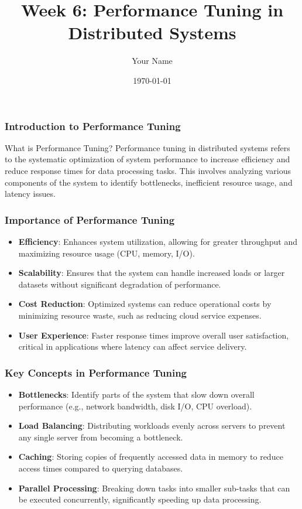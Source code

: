 \documentclass{beamer}
\title{Week 6: Performance Tuning in Distributed Systems}
\author{Your Name}
\institute{Your Institution}
\date{\today}
\begin{document}
\frame{\titlepage}

\begin{frame}[fragile]
    \frametitle{Introduction to Performance Tuning}
    \begin{block}{What is Performance Tuning?}
        Performance tuning in distributed systems refers to the systematic optimization of system performance to increase efficiency and reduce response times for data processing tasks. This involves analyzing various components of the system to identify bottlenecks, inefficient resource usage, and latency issues.
    \end{block}
\end{frame}

\begin{frame}[fragile]
    \frametitle{Importance of Performance Tuning}
    \begin{itemize}
        \item \textbf{Efficiency}: Enhances system utilization, allowing for greater throughput and maximizing resource usage (CPU, memory, I/O).
        \item \textbf{Scalability}: Ensures that the system can handle increased loads or larger datasets without significant degradation of performance.
        \item \textbf{Cost Reduction}: Optimized systems can reduce operational costs by minimizing resource waste, such as reducing cloud service expenses.
        \item \textbf{User Experience}: Faster response times improve overall user satisfaction, critical in applications where latency can affect service delivery.
    \end{itemize}
\end{frame}

\begin{frame}[fragile]
    \frametitle{Key Concepts in Performance Tuning}
    \begin{itemize}
        \item \textbf{Bottlenecks}: Identify parts of the system that slow down overall performance (e.g., network bandwidth, disk I/O, CPU overload).
        \item \textbf{Load Balancing}: Distributing workloads evenly across servers to prevent any single server from becoming a bottleneck.
        \item \textbf{Caching}: Storing copies of frequently accessed data in memory to reduce access times compared to querying databases.
        \item \textbf{Parallel Processing}: Breaking down tasks into smaller sub-tasks that can be executed concurrently, significantly speeding up data processing.
    \end{itemize}
\end{frame}
\end{document}
